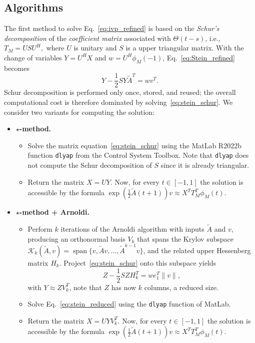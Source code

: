 \documentclass[final,1p,times,number]{elsarticle}
\theoremstyle{plain}%
\begin{document}
\subsection{Algorithms}\label{subsec1}
The first method to solve Eq.~\eqref{eq:ivp_refined} is based on the \emph{Schur's decomposition} of the \emph{coefficient matrix} associated with $\Theta(t-s)$, i.e., $T_M = USU^{H},$
where $U$ is unitary and $S$ is a upper triangular matrix.  
With the change of variables $Y=U^{H}X$ and $w=U^{H}\phi_M(-1)$, Eq.~\eqref{eq:Stein_refined}
becomes
\begin{equation}\label{eq:stein_schur}
    Y - \frac12 S Y \tilde{A}^{T} = w v^{T}.
\end{equation} 
Schur decomposition is performed only once, stored, and reused; the overall computational cost is therefore dominated by solving~\eqref{eq:stein_schur}.
We consider two variants for computing the solution:
\begin{itemize}
  \item[\textbf{1.}]\textbf{$\star$-method.}  
    \begin{itemize}
        \item Solve the matrix equation~\eqref{eq:stein_schur} using the MatLab R2022b function \texttt{dlyap} from the Control System Toolbox. Note that \texttt{dlyap} does not compute the Schur decomposition of $S$ since it is already triangular.
        \item Return the matrix $X = UY.$ Now, for every $t \in [-1, 1]$ the solution is accessible by the formula \( \exp\left(\frac{1}{2}\tilde{A}(t+1)\right)v \approx   X^T T_M^T \phi_M(t)  \).
    \end{itemize}

  \item[\textbf{2.}]\textbf{$\star$-method + Arnoldi.}  
    \begin{itemize}
        \item Perform $k$ iterations of the Arnoldi algorithm with inputs $\tilde{A}$ and $v$, producing an orthonormal basis $V_k$ that spans the Krylov subspace $
            \mathcal{K}_k(\tilde{A},v) = \operatorname{span}\{v, \tilde{A}v, \ldots, \tilde{A}^{k-1}v\}$, and the related upper Hessenberg matrix $H_k$. Project~\eqref{eq:stein_schur} onto this subspace yields
        \begin{equation}\label{eq:stein_reduced}
            Z - \frac{1}{2}S Z H_k^{T} = w e_1^{T} \| v \|,
        \end{equation}
        with $Y \approx Z V_k^T$, note that $Z$ has now $k$ columns, a reduced size.
        \item Solve Eq.~\eqref{eq:stein_reduced} using the \texttt{dlyap} function of MatLab.
        \item Return the matrix $X = U Y V_k^T$. Now, for every $t \in [-1, 1]$ the solution is accessible by the formula \( \exp\left(\frac{1}{2}{\tilde{A}}(t+1)\right)v \approx  X^T T_M^T \phi_M(t)  \).
    \end{itemize}
\end{itemize}
\end{document}
